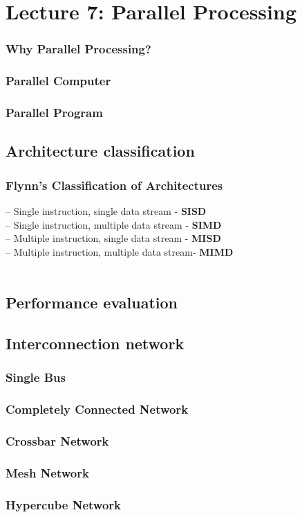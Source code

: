 \section{Lecture 7: Parallel Processing}
\subsubsection{Why Parallel Processing?}
\subsubsection{Parallel Computer}
\subsubsection{Parallel Program}

\subsection{Architecture classification}
\subsubsection{Flynn’s Classification of Architectures}
-- Single instruction, single data stream - \textbf{SISD} \\
-- Single instruction, multiple data stream - \textbf{SIMD} \\
-- Multiple instruction, single data stream - \textbf{MISD} \\
-- Multiple instruction, multiple data stream- \textbf{MIMD} \\

\\

\subsection{Performance evaluation}

\subsection{Interconnection network}
\subsubsection{Single Bus}
\subsubsection{Completely Connected Network}
\subsubsection{Crossbar Network}
\subsubsection{Mesh Network}
\subsubsection{Hypercube Network}
